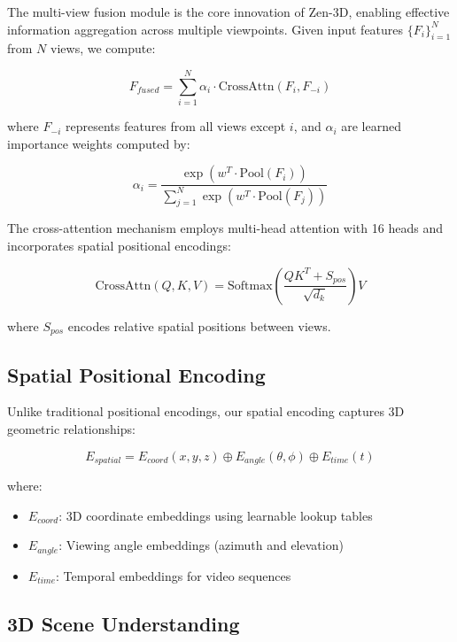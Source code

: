 \documentclass[11pt,a4paper]{article}
\begin{document}
The multi-view fusion module is the core innovation of Zen-3D, enabling effective information aggregation across multiple viewpoints. Given input features $\{F_i\}_{i=1}^N$ from $N$ views, we compute:

\begin{equation}
    F_{fused} = \sum_{i=1}^{N} \alpha_i \cdot \text{CrossAttn}(F_i, F_{-i})
\end{equation}

where $F_{-i}$ represents features from all views except $i$, and $\alpha_i$ are learned importance weights computed by:

\begin{equation}
    \alpha_i = \frac{\exp(w^T \cdot \text{Pool}(F_i))}{\sum_{j=1}^{N} \exp(w^T \cdot \text{Pool}(F_j))}
\end{equation}

The cross-attention mechanism employs multi-head attention with 16 heads and incorporates spatial positional encodings:

\begin{equation}
    \text{CrossAttn}(Q, K, V) = \text{Softmax}\left(\frac{QK^T + S_{pos}}{\sqrt{d_k}}\right)V
\end{equation}

where $S_{pos}$ encodes relative spatial positions between views.

\subsection{Spatial Positional Encoding}

Unlike traditional positional encodings, our spatial encoding captures 3D geometric relationships:

\begin{equation}
    E_{spatial} = E_{coord}(x, y, z) \oplus E_{angle}(\theta, \phi) \oplus E_{time}(t)
\end{equation}

where:
\begin{itemize}
    \item $E_{coord}$: 3D coordinate embeddings using learnable lookup tables
    \item $E_{angle}$: Viewing angle embeddings (azimuth and elevation)
    \item $E_{time}$: Temporal embeddings for video sequences
\end{itemize}

\subsection{3D Scene Understanding}
\end{document}
